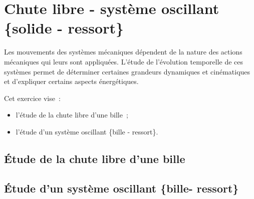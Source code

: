 \section{Chute libre - système oscillant \{solide - ressort\}}
Les mouvements des systèmes mécaniques dépendent de la nature des actions
mécaniques qui leurs sont appliquées. L'étude de l'évolution temporelle de ces
systèmes permet de déterminer certaines grandeurs dynamiques et cinématiques et
d'expliquer certains aspects énergétiques.

Cet exercice vise~:
\begin{itemize}
    \item l'étude de la chute libre d'une bille~;
    \item l'étude d'un système oscillant \{bille - ressort\}.
\end{itemize}

\subsection{Étude de la chute libre d'une bille}


\subsection{Étude d'un système oscillant \{bille- ressort\}}

